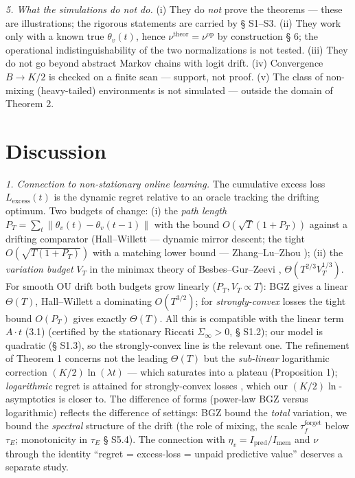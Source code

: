 \documentclass[12pt]{iopart}
\begin{document}
\emph{5. What the simulations do not do.} (i) They do \emph{not} prove the theorems --- these are illustrations; the rigorous statements are carried by § S1--S3. (ii) They work only with a known true \(\theta_v(t)\), hence \(\nu^{\text{theor}} = \nu^{\text{op}}\) by construction \cite{Andriishin2026b} § 6; the operational indistinguishability of the two normalizations is not tested. (iii) They do not go beyond abstract Markov chains with logit drift. (iv) Convergence \(B \to K/2\) is checked on a finite scan --- support, not proof. (v) The class of non-mixing (heavy-tailed) environments is not simulated --- outside the domain of Theorem 2.



\section{Discussion}\label{discussion}



\emph{1. Connection to non-stationary online learning.} The cumulative excess loss \(L_{\text{excess}}(t)\) is the dynamic regret relative to an oracle tracking the drifting optimum. Two budgets of change: (i) the \emph{path length} \(P_T = \sum_t \|\theta_v(t)-\theta_v(t-1)\|\) \cite{Zinkevich2003} with the bound \(O(\sqrt{T}(1+P_T))\) against a drifting comparator (Hall--Willett \cite{HallWillett2015} --- dynamic mirror descent; the tight \(O(\sqrt{T(1+P_T)})\) with a matching lower bound --- Zhang--Lu--Zhou \cite{ZhangLuZhou2018}); (ii) the \emph{variation budget} \(V_T\) in the minimax theory of Besbes--Gur--Zeevi \cite{BesbesGurZeevi2015}, \(\Theta(T^{2/3}V_T^{1/3})\). For smooth OU drift both budgets grow linearly (\(P_T, V_T \propto T\)): BGZ gives a linear \(\Theta(T)\), Hall--Willett a dominating \(O(T^{3/2})\); for \emph{strongly-convex} losses the tight bound \(O(P_T)\) \cite{Mokhtari2016} gives exactly \(\Theta(T)\). All this is compatible with the linear term \(A\cdot t\) (3.1) (certified by the stationary Riccati \(\Sigma_\infty > 0\), § S1.2); our model is quadratic (§ S1.3), so the strongly-convex line is the relevant one. The refinement of Theorem 1 concerns not the leading \(\Theta(T)\) but the \emph{sub-linear} logarithmic correction \((K/2)\ln(\lambda t)\) --- which saturates into a plateau (Proposition 1); \emph{logarithmic} regret is attained for strongly-convex losses \cite{Hazan2007,HazanSeshadhri2009}, which our \((K/2)\ln\)-asymptotics is closer to. The difference of forms (power-law BGZ versus logarithmic) reflects the difference of settings: BGZ bound the \emph{total} variation, we bound the \emph{spectral} structure of the drift (the role of mixing, the scale \(\tau_f^{\text{forget}}\) below \(\tau_E\); monotonicity in \(\tau_E\) \cite{Andriishin2026b} § S5.4). The connection with \(\eta_v = I_{\text{pred}}/I_{\text{mem}}\) and \(\nu\) through the identity ``regret = excess-loss = unpaid predictive value'' \cite{CesaBianchiLugosi2006,Hazan2007} deserves a separate study.
\end{document}
